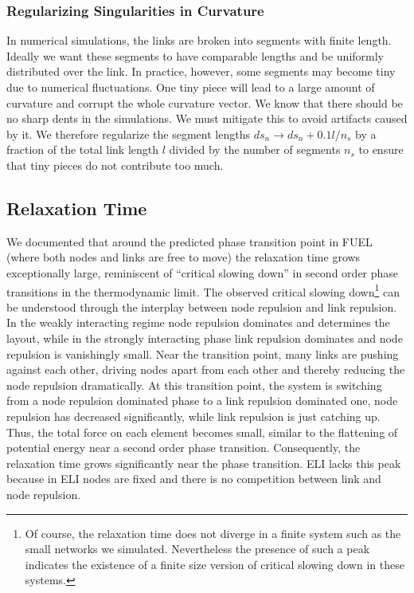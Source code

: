 \documentclass[endfloats,nofootinbib,preprint,floatfix,titlepage,superscriptaddress]{revtex4} %
\begin{document}
\subsubsection{Regularizing Singularities in Curvature}
In numerical simulations, the links are broken into segments with finite length. 
Ideally we want these segments to have comparable lengths and be uniformly distributed over the link. 
In practice, however, some segments may become tiny due to numerical fluctuations. 
One tiny piece will lead to a large amount of curvature and corrupt the whole curvature vector. 
We know that there should be no sharp dents in the simulations. %
We must mitigate this to avoid artifacts caused by it. 
We therefore regularize the segment lengths $ds_n\to ds_n+ 0.1 l/n_s$ by a fraction of the total link length $l$ divided by the number of segments $n_s$ to ensure that tiny pieces do not contribute too much. 

\subsection{Relaxation Time \label{ap:relax}}
We documented that around the predicted phase transition point in FUEL (where both nodes and links are free to move) the relaxation time grows exceptionally large, reminiscent of ``critical slowing down'' in second order phase transitions in the thermodynamic limit.  
The observed critical slowing down\footnote{Of course, the relaxation time does not diverge in a finite system such as the small networks we simulated. 
Nevertheless the presence of such a peak indicates the existence of a finite size version of critical slowing down in these systems.} 
can be understood through the interplay between node repulsion and link repulsion. 
In the weakly interacting regime node repulsion dominates and determines the layout, while in the strongly interacting phase link repulsion dominates and node repulsion is vanishingly small. 
Near the transition point, many links are pushing against each other, driving nodes apart from each other and thereby reducing the node repulsion dramatically. 
At this transition point, the system is switching from a node repulsion dominated phase to a link repulsion dominated one, node repulsion has decreased significantly, while link repulsion is just catching up. 
Thus, the total force on each element becomes small, similar to the flattening of potential energy near a second order phase transition.
Consequently, the relaxation time grows significantly near the phase transition. 
ELI lacks this peak %
because in ELI nodes are fixed and there is no competition between link and node repulsion. 
\end{document}
